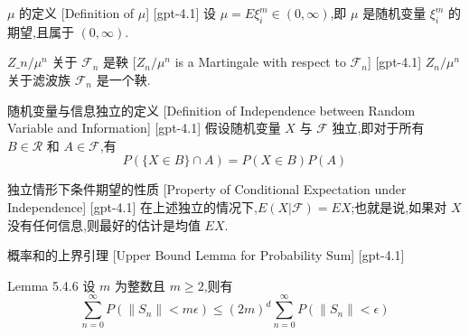 \documentclass[UTF8]{ctexart}
\begin{document}
    
    
    \begin{dfn}
        [Definition-of-$\mu$]
        {$\mu$ 的定义}
        [Definition of $\mu$]
        [gpt-4.1]
        设 $\mu = E \xi_i^m \in (0, \infty)$,即 $\mu$ 是随机变量 $\xi_i^m$ 的期望,且属于 $(0, \infty)$.
    \end{dfn}
    
    
    
    \begin{thm}
        {$Z\_n/\mu^n$ 关于 $\mathcal{F}_n$ 是鞅}
        [$Z_n/\mu^n$ is a Martingale with respect to $\mathcal{F}_n$]
        [gpt-4.1]
        $Z_n / \mu^n$ 关于滤波族 ${\mathcal{F}}_n$ 是一个鞅.
    \end{thm}
    
    
    
    \begin{dfn}
        {随机变量与信息独立的定义}
        [Definition of Independence between Random Variable and Information]
        [gpt-4.1]
        假设随机变量 $X$ 与 $\mathcal{F}$ 独立,即对于所有 $B \in \mathcal{R}$ 和 $A \in \mathcal{F}$,有
\[
P(\{ X \in B \} \cap A) = P(X \in B) P(A)
\]

    \end{dfn}
    
    
    
    \begin{thm}
        {独立情形下条件期望的性质}
        [Property of Conditional Expectation under Independence]
        [gpt-4.1]
        在上述独立的情况下,$E(X | \mathcal{F}) = EX$;也就是说,如果对 $X$ 没有任何信息,则最好的估计是均值 $EX$.

    \end{thm}
    
    
    
    \begin{lma}
        {概率和的上界引理}
        [Upper Bound Lemma for Probability Sum]
        [gpt-4.1]
        
Lemma 5.4.6 设 $m$ 为整数且 $m \geq 2$,则有
\[
\sum_{n=0}^{\infty} P(\|S_{n}\| < m\epsilon) \leq (2m)^{d} \sum_{n=0}^{\infty} P(\|S_{n}\| < \epsilon)
\]

    \end{lma}
    
\end{document}
